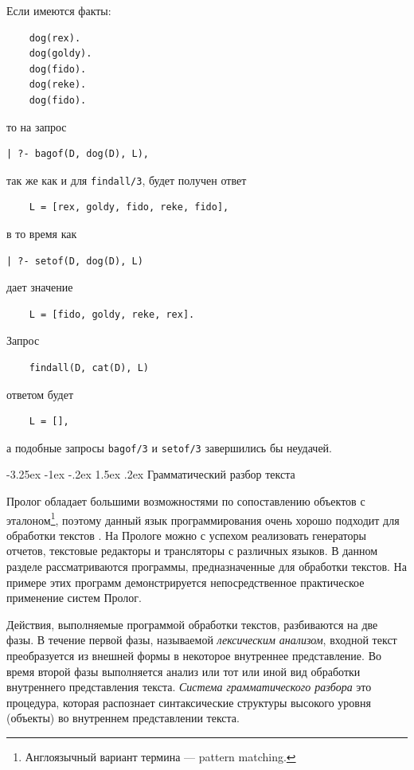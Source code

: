 \documentclass[12pt, openany, twoside]{book} %
\makeatletter
\renewcommand\section{\@startsection {section}{1}{\z@}%
                                   {-3.25ex \@plus -1ex \@minus -.2ex}%
                                   {1.5ex \@plus.2ex}%
                                   {\normalfont\large\bfseries}}
\makeatother
\begin{document}
Если имеются факты:

{\tt\begin{verbatim}
    dog(rex).
    dog(goldy).
    dog(fido).
    dog(reke).
    dog(fido).
\end{verbatim}}

\noindent то на запрос

{\tt\begin{verbatim}
| ?- bagof(D, dog(D), L),
\end{verbatim}}

\noindent так же как и для {\tt findall/3}, будет получен ответ
{\tt\begin{verbatim}
    L = [rex, goldy, fido, reke, fido],
\end{verbatim}}

\noindent в то время как

{\tt\begin{verbatim}
| ?- setof(D, dog(D), L)
\end{verbatim}}

\noindent дает значение
{\tt\begin{verbatim}
    L = [fido, goldy, reke, rex].
\end{verbatim}}

\noindent Запрос
{\tt\begin{verbatim}
    findall(D, cat(D), L)
\end{verbatim}}

\noindent ответом будет
{\tt\begin{verbatim}
    L = [],
\end{verbatim}}
\noindent а подобные запросы {\tt bagof/3} и {\tt setof/3} завершились бы неудачей.

\section{Грамматический разбор текста}

Пролог обладает большими возможностями по сопоставлению объектов с эталоном\footnote{Англоязычный вариант термина --- pattern matching.}, поэтому данный язык программирования очень хорошо подходит для обработки текстов \cite{Malpas}. На Прологе можно с успехом реализовать генераторы отчетов, текстовые редакторы и трансляторы с различных языков. В данном разделе рассматриваются программы, предназначенные для обработки текстов. На примере этих программ демонстрируется непосредственное практическое применение систем Пролог.

Действия, выполняемые программой обработки текстов, разбиваются на две фазы. В течение первой фазы, называемой \emph{лексическим анализом}, входной текст преобразуется из внешней формы в некоторое внутреннее представление. Во время второй фазы выполняется анализ или тот или иной вид обработки внутреннего представления текста. \emph{Система грамматического разбора} это процедура, которая распознает синтаксические структуры высокого уровня (объекты) во внутреннем представлении текста.
\end{document}
